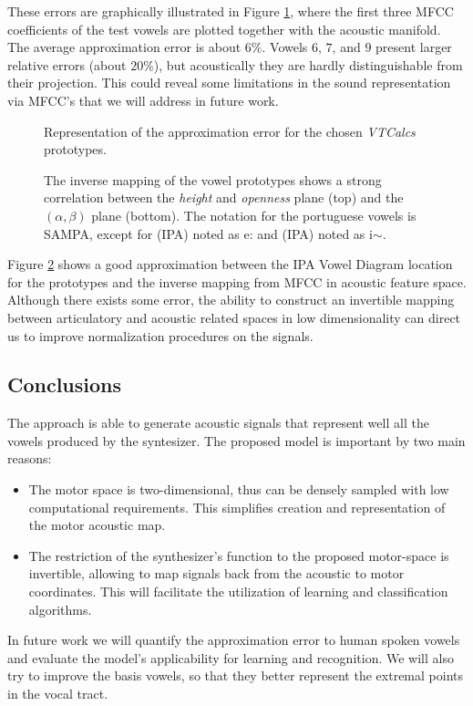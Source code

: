 These errors are graphically illustrated in Figure \ref{fig:convport},
where the first three MFCC coefficients of the test vowels are plotted
together with the acoustic manifold. The average approximation error
is about $6\%$. Vowels $6$, $7$, and $9$ present larger relative
errors (about $20\%$), but acoustically they are hardly
distinguishable from their projection. This could reveal some
limitations in the sound representation via MFCC's that we will
address in future work.

\begin{figure}[!h]
  \hspace{-1cm}
  \caption{Representation of the approximation error for the chosen
    \emph{VTCalcs} prototypes.}
  \label{fig:convport}
\end{figure}

\begin{figure}[!h]
  \centering
  \caption{The inverse mapping of the vowel prototypes shows a strong
    correlation between the \emph{height} and \emph{openness} plane
    (top) and the $(\alpha,\beta)$ plane (bottom). The notation for
    the portuguese vowels is SAMPA, except for  \textipa{[e]} (IPA)
    noted as e: and  \textipa{[1]} (IPA) noted as i$\sim$.}
  \label{fig:motormaeda}
\end{figure}

Figure \ref{fig:motormaeda} shows a good approximation between the IPA
Vowel Diagram location for the prototypes and the inverse mapping from
MFCC in acoustic feature space. Although there exists some error, the
ability to construct an invertible mapping between articulatory and
acoustic related spaces in low dimensionality can direct us to improve
normalization procedures on the signals.

\subsection{Conclusions}
The approach is able to generate acoustic signals that represent well
all the vowels produced by the syntesizer.
The proposed model is important by two main reasons:
\begin{itemize}
\item The motor space is two-dimensional, thus can be densely sampled
  with low computational requirements.
  This simplifies creation and representation of the motor acoustic map.
\item The restriction of the synthesizer's function to the proposed
  motor-space is invertible, allowing to map signals back from the
  acoustic to motor coordinates. This will facilitate the utilization
  of learning and classification algorithms.
\end{itemize}
In future work we will quantify the approximation error to human
spoken vowels and evaluate the model's applicability for learning and
recognition. We will also try to improve the basis vowels, so that
they better represent the extremal points in the vocal tract.

